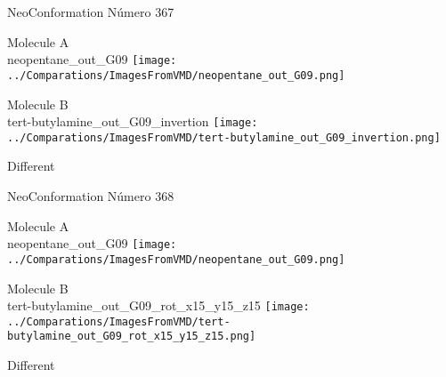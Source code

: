 \vtab[-2cm]
\begin{center}
{\large NeoConformation \tab Número 367}
\end{center}
\begin{multicols}{2}
\begin{center}
Molecule A \\ 
neopentane\_out\_G09
\texttt{[image: ../Comparations/ImagesFromVMD/neopentane\_out\_G09.png]}
\\
\vtab

\columnbreak
Molecule B \\ 
tert-butylamine\_out\_G09\_invertion
\texttt{[image: ../Comparations/ImagesFromVMD/tert-butylamine\_out\_G09\_invertion.png]}
\\
\vtab


\end{center}
\end{multicols}
\begin{center}
\vtab
\vtab
\textcolor{NavyBlue}{\Large Different}
\end{center}

 \newpage

\vtab[-2cm]
\begin{center}
{\large NeoConformation \tab Número 368}
\end{center}
\begin{multicols}{2}
\begin{center}
Molecule A \\ 
neopentane\_out\_G09
\texttt{[image: ../Comparations/ImagesFromVMD/neopentane\_out\_G09.png]}
\\
\vtab

\columnbreak
Molecule B \\ 
tert-butylamine\_out\_G09\_rot\_x15\_y15\_z15
\texttt{[image: ../Comparations/ImagesFromVMD/tert-butylamine\_out\_G09\_rot\_x15\_y15\_z15.png]}
\\
\vtab


\end{center}
\end{multicols}
\begin{center}
\vtab
\vtab
\textcolor{NavyBlue}{\Large Different}
\end{center}

 \newpage

